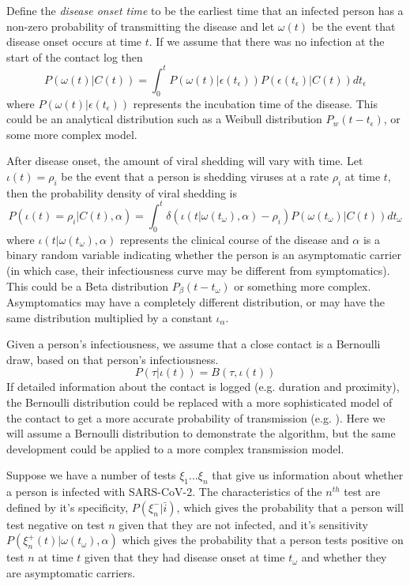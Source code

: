\documentclass{article}
\begin{document}
Define the \textit{disease onset time} to be the earliest time that an infected person has a non-zero probability of transmitting the disease and let $\omega(t)$ be the event that disease onset occurs at time $t$. If we assume that there was no infection at the start of the contact log then
\begin{equation}
P(\omega(t)|C(t)) = \int_0^{t} P(\omega(t)|\epsilon(t_\epsilon))P(\epsilon(t_\epsilon)|C(t)) dt_\epsilon
\end{equation}
where $P(\omega(t)|\epsilon(t_\epsilon))$ represents the incubation time of the disease. This could be an analytical distribution such as a Weibull distribution $P_w(t-t_\epsilon)$, or some more complex model.

After disease onset, the amount of viral shedding will vary with time. Let $\iota(t) = \rho_i$ be the event that a person is shedding viruses at a rate $\rho_i$ at time $t$, then the probability density of viral shedding is
\begin{equation}
P(\iota(t) = \rho_i|C(t),\alpha) = \int_0^t \delta(\iota(t|\omega(t_\omega),\alpha)-\rho_i)P(\omega(t_\omega)|C(t)) dt_\omega
\end{equation}
where $\iota(t|\omega(t_\omega),\alpha)$ represents the clinical course of the disease and $\alpha$ is a binary random variable indicating whether the person is an asymptomatic carrier (in which case, their infectiousness curve may be different from symptomatics). This could be a Beta distribution $P_\beta(t-t_\omega)$ or something more complex. Asymptomatics may have a completely different distribution, or may have the same distribution multiplied by a constant $\iota_\alpha$.

Given a person's infectiousness, we assume that a close contact is a Bernoulli draw, based on that person's infectiousness.
\begin{equation}
P(\tau|\iota(t)) = B(\tau, \iota(t))
\end{equation}
If detailed information about the contact is logged (e.g. duration and proximity), the Bernoulli distribution could be replaced with a more sophisticated model of the contact to get a more accurate probability of transmission (e.g. \cite{sattler2020risk}). Here we will assume a Bernoulli distribution to demonstrate the algorithm, but the same development could be applied to a more complex transmission model.

Suppose we have a number of tests $\xi_1...\xi_n$ that give us information about whether a person is infected with SARS-CoV-2. The characteristics of the $n^{th}$ test are defined by it's specificity, $P(\xi^-_n|\bar{i})$, which gives the probability that a person will test negative on test $n$ given that they are not infected, and it's sensitivity $P(\xi^+_n(t)|\omega(t_\omega),\alpha)$ which gives the probability that a person tests positive on test $n$ at time $t$ given that they had disease onset at time $t_\omega$ and whether they are asymptomatic carriers.
\end{document}
